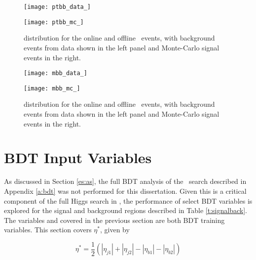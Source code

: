 		\begin{figure}[h]
			\centering
			\begin{minipage}[h]{0.48\linewidth}
				\texttt{[image: ptbb\_data\_]}
			\end{minipage}
			\quad
			\begin{minipage}[h]{0.48\linewidth}
				\texttt{[image: ptbb\_mc\_]}
			\end{minipage}
			\label{f:ptbb}
			\caption[Comparison of the \ptbb distribution of the \VBFHBB\ events for HLT and offline objects]{\ptbb distribution for the online and offline \VBFHBB\ events, with background events from data shown in the left panel and Monte-Carlo signal events in the right.}
		\end{figure}

		\begin{figure}[h]
			\centering
			\begin{minipage}[h]{0.48\linewidth}
				\texttt{[image: mbb\_data\_]}
			\end{minipage}
			\quad
			\begin{minipage}[h]{0.48\linewidth}
				\texttt{[image: mbb\_mc\_]}
			\end{minipage}
			\label{f:mbb}
			\caption[Comparison of the \mbb distribution of the \VBFHBB\ events for HLT and offline objects]{\mbb distribution for the online and offline \VBFHBB\ events, with background events from data shown in the left panel and Monte-Carlo signal events in the right.}
		\end{figure}


\section{BDT Input Variables}

	As discussed in Section \ref{es:as}, the full BDT analysis of the \VBFHBB\ search described in Appendix \ref{a:bdt} was not performed for this dissertation. Given this is a critical component of the full Higgs search \cite{VBFHbb8tev} in \VBFHBB, the performance of select BDT variables is explored for the signal and background regions described in Table \ref{t:signalback}. The variables \mjj and \ptjj covered in the previous section are both BDT training variables. This section covers $\eta^*$, given by

	\begin{equation}
	\eta^* = \frac{1}{2}(|\eta_{j1}| + |\eta_{j2}| - |\eta_{b1}| - |\eta_{b2}|)
	\end{equation}

